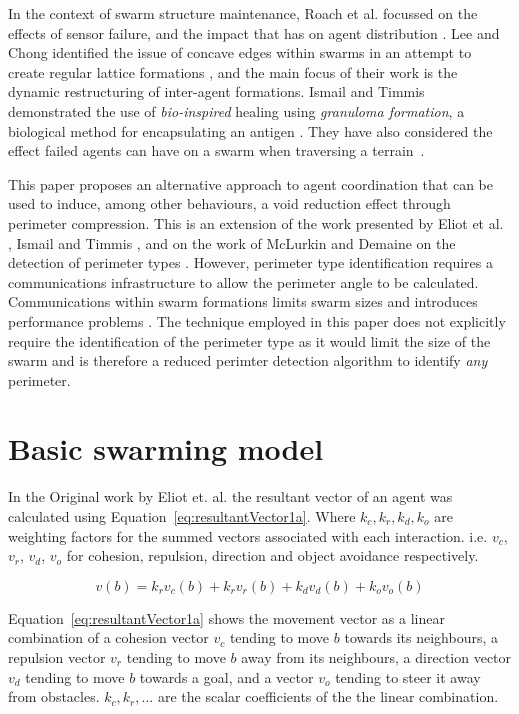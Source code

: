 \documentclass[12pt,a4paper]{IEEEtran}
\newcommand{\kc}{\mathit{k_c}}
\newcommand{\kr}{\mathit{k_r}}
\newcommand{\kd}{\mathit{k_d}}
\newcommand{\ko}{\mathit{k_o}}
\begin{document}
In the context of swarm structure maintenance, Roach et al. focussed on the effects of sensor failure, and the impact that has on agent distribution \cite{RMT:15}. Lee and Chong identified the issue of concave edges within swarms in an attempt to create regular lattice formations \cite{GN:08}, and the main focus of their work is the dynamic restructuring of inter-agent formations. Ismail and Timmis demonstrated the use of \textit{bio-inspired} healing using \textit{granuloma formation}, a biological method for encapsulating an antigen \cite{IT:10}. They have also considered the effect failed agents can have on a swarm when traversing a terrain~\cite{TIBW:16}. 

This paper proposes an alternative approach to agent coordination that can be used to induce, among other behaviours, a void reduction effect through perimeter compression. This is an extension of the work presented by Eliot et al. \cite{eliot2019void}, Ismail and Timmis \cite{IT:10,TIBW:16}, and on the work of McLurkin and Demaine on the detection of perimeter types \cite{mclurkin2009}. However, perimeter type identification requires a communications infrastructure to allow the perimeter angle to be calculated. Communications within swarm formations limits swarm sizes and introduces performance problems \cite{fu2020formation}. The technique employed in this paper does not explicitly require the identification of the perimeter type as it would limit the size of the swarm\cite{eliot2019void,GN:08} and is therefore a reduced perimter detection algorithm to identify \textit{any} perimeter.

\section{Basic swarming model}\label{sec:basicModel}
In the Original work by Eliot et. al. the resultant vector of an agent was calculated using Equation~\ref{eq:resultantVector1a}. Where $\kc, \kr, k_d, k_o$ are weighting factors for the summed vectors associated with each interaction. i.e. $v_c$, $v_r$, $v_d$, $v_o$ for cohesion, repulsion, direction and object avoidance respectively. 

\begin{equation}\label{eq:resultantVector1a}
	v(b) = \kr v_c(b) + \kr v_r(b) + \kd v_d(b) + \ko v_o(b)
\end{equation}

Equation~\ref{eq:resultantVector1a} shows the movement vector as a linear combination of a cohesion vector $v_c$ tending to move $b$ towards its neighbours, a repulsion vector $v_r$ tending to move $b$ away from its neighbours, a direction vector  $v_d$ tending to move $b$ towards a goal, and a vector $v_o$ tending to steer it away from obstacles. $\kc, \kr, ...$ are the scalar coefficients of the the linear combination.
\end{document}
